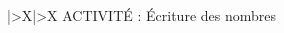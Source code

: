 \documentclass[12pt,french]{book}
\begin{document}
\thispagestyle{garde}

\medskip

\begin{tabularx}{\linewidth}{|>\centering X|>\centering X}
\hline 
\large ACTIVITÉ : \tabularnewline 
\Large Écriture des nombres \tabularnewline
\hline
\end{tabularx} 
\medskip


\begin{spacing}{1.2} %


%

\medskip\exercice  \\





\medskip\exercice \\




\medskip\exercice \\



\medskip\exercice \par




%



\end{spacing}
\end{document}
